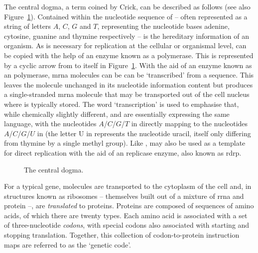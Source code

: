 \documentclass[thesis.tex]{subfiles}
\begin{document}
The central dogma, a term coined by Crick, can be described as follows (see also Figure~\ref{fig:central_dogma}). Contained within the nucleotide sequence of  -- often represented as a string of letters $A$, $C$, $G$ and $T$,  representing the nucleotide bases adenine, cytosine, guanine and thymine respectively -- is the hereditary information of an organism. As is necessary for replication at the cellular or organismal level,  can be copied with the help of an enzyme known as a  polymerase. This is represented by a cyclic arrow from  to itself in Figure~\ref{fig:central_dogma}. With the aid of an enzyme known as an  polymerase, \gls{mrna} molecules can be can be `transcribed' from a  sequence. This leaves the  molecule unchanged in its nucleotide information content but produces a single-stranded \gls{mrna} molecule that may be transported out of the cell nucleus where  is typically stored. The word `transcription' is used to emphasise that, while chemically slightly different,  and  are essentially expressing the same language, with the nucleotides $A$/$C$/$G$/$T$ in  directly mapping to the nucleotides $A$/$C$/$G$/$U$ in  (the letter U in represents the nucleotide uracil, itself only differing from thymine by a single methyl group). Like ,  may also be used as a template for direct replication with the aid of an  replicase enzyme, also known as \gls{rdrp}.

\begin{figure}[htbp]
\centering
{}
\caption{The central dogma.\label{fig:central_dogma}}
\end{figure}

For a typical gene,  molecules are transported to the cytoplasm of the cell and, in structures known as ribosomes -- themselves built out of a mixture of \gls{rrna} and protein --, are \emph{translated} to proteins. Proteins are composed of sequences of amino acids, of which there are twenty types. Each amino acid is associated with a set of three-nucleotide \emph{codons}, with special codons also associated with starting and stopping translation. Together, this collection of codon-to-protein instruction maps are referred to as the `genetic code'.
\end{document}
